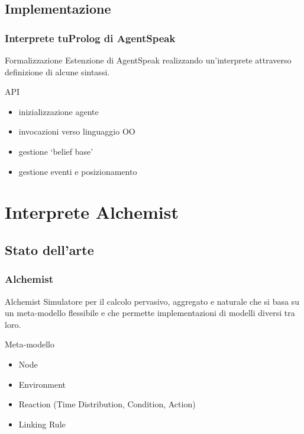 \documentclass[handout]{beamer}\mode<presentation>{\usetheme{AMSCesenaBleu}}
\begin{document}
\subsection{Implementazione}

\begin{frame}
\frametitle{Interprete tuProlog di AgentSpeak}
\begin{block}{Formalizzazione}
Estenzione di AgentSpeak realizzando un'interprete attraverso definizione di alcune sintassi.
\end{block}

\begin{block}{API}
\begin{itemize}
\item inizializzazione agente
\item invocazioni verso linguaggio OO
\item gestione `belief base'
\item gestione eventi e posizionamento
\end{itemize}
\end{block}
\end{frame}



\section{Interprete Alchemist}

\subsection{Stato dell'arte}

\begin{frame}
\frametitle{Alchemist}
\begin{block}{Alchemist}
Simulatore per il calcolo pervasivo, aggregato e naturale che si basa su un meta-modello flessibile e che permette implementazioni di modelli diversi tra loro.
\end{block}
\begin{block}{Meta-modello}
\begin{itemize}
\item Node
\item Environment
\item Reaction (Time Distribution, Condition, Action)
\item Linking Rule
\end{itemize}
\end{block}
\end{frame}
\end{document}
